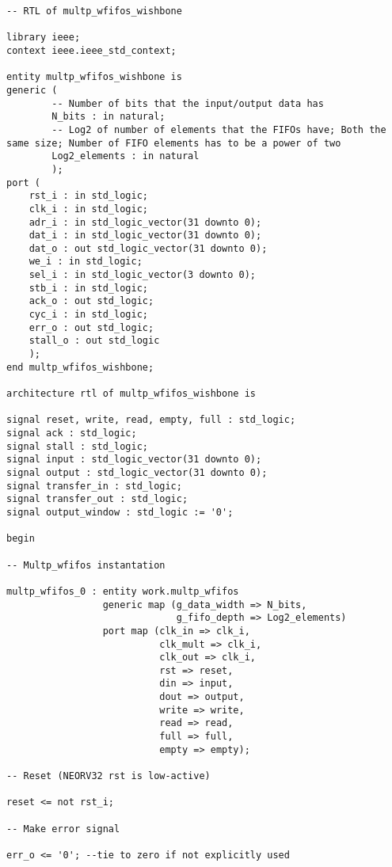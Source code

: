 \begin{code}
\begin{verbatim}
-- RTL of multp_wfifos_wishbone

library ieee;
context ieee.ieee_std_context;

entity multp_wfifos_wishbone is
generic (  
        -- Number of bits that the input/output data has
        N_bits : in natural;
        -- Log2 of number of elements that the FIFOs have; Both the same size; Number of FIFO elements has to be a power of two
        Log2_elements : in natural
        );
port (
    rst_i : in std_logic;
    clk_i : in std_logic;
    adr_i : in std_logic_vector(31 downto 0);
    dat_i : in std_logic_vector(31 downto 0);
    dat_o : out std_logic_vector(31 downto 0);
    we_i : in std_logic;
    sel_i : in std_logic_vector(3 downto 0);
    stb_i : in std_logic;
    ack_o : out std_logic;
    cyc_i : in std_logic;
    err_o : out std_logic;
    stall_o : out std_logic
    );
end multp_wfifos_wishbone;

architecture rtl of multp_wfifos_wishbone is

signal reset, write, read, empty, full : std_logic;
signal ack : std_logic;
signal stall : std_logic;
signal input : std_logic_vector(31 downto 0);
signal output : std_logic_vector(31 downto 0);
signal transfer_in : std_logic;
signal transfer_out : std_logic;
signal output_window : std_logic := '0';

begin

-- Multp_wfifos instantation

multp_wfifos_0 : entity work.multp_wfifos
                 generic map (g_data_width => N_bits,
                              g_fifo_depth => Log2_elements)
                 port map (clk_in => clk_i,
                           clk_mult => clk_i,
                           clk_out => clk_i,
                           rst => reset,
                           din => input,
                           dout => output,
                           write => write,
                           read => read,
                           full => full,
                           empty => empty);

-- Reset (NEORV32 rst is low-active)

reset <= not rst_i;

-- Make error signal

err_o <= '0'; --tie to zero if not explicitly used


\end{verbatim}
\end{code}
